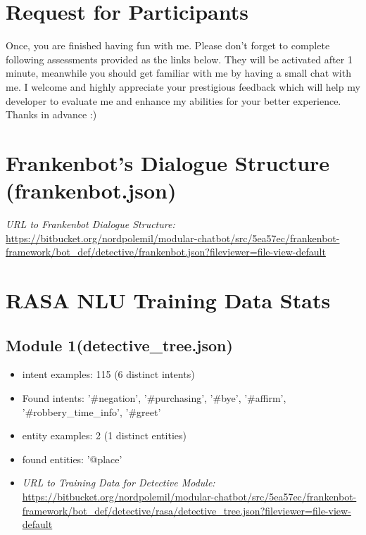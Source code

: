 \begin{appendix}
\section{Request for Participants\label{appen:req}}
Once, you are finished having fun with me. Please don't forget to complete following assessments provided as the links below. They will be activated after 1 minute, meanwhile you should get familiar with me by having a small chat with me. I welcome and highly appreciate your prestigious feedback which will help my developer to evaluate me and enhance my abilities for your better experience. Thanks in advance :)

\section{Frankenbot's Dialogue Structure  (frankenbot.json)\label{appen:frankJson}}
    \item \textit{URL to Frankenbot Dialogue Structure: }\url{https://bitbucket.org/nordpolemil/modular-chatbot/src/5ea57ec/frankenbot-framework/bot_def/detective/frankenbot.json?fileviewer=file-view-default}

\section{RASA NLU Training Data Stats\label{appen:traindatastats}}

\subsection{Module 1(detective\_tree.json)\label{appen:detectiveJson}}
\begin{itemize}
    \item intent examples: 115 (6 distinct intents)
	\item Found intents: '\#negation', '\#purchasing', '\#bye', '\#affirm', '\#robbery\_time\_info', '\#greet'
	\item entity examples: 2 (1 distinct entities)
	\item found entities: '@place'
	\item \textit{URL to Training Data for Detective Module: }\url{https://bitbucket.org/nordpolemil/modular-chatbot/src/5ea57ec/frankenbot-framework/bot_def/detective/rasa/detective\_tree.json?fileviewer=file-view-default}
\end{itemize}
	

\end{appendix}
